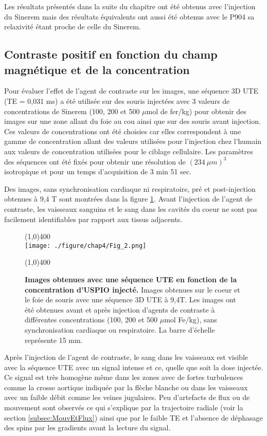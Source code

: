 Les résultats présentés dans la suite du chapitre ont été obtenus avec l'injection du Sinerem mais des résultats équivalents ont aussi été obtenus avec le P904 sa relaxivité étant proche de celle du Sinerem.

\subsection{Contraste positif en fonction du champ magnétique et de la concentration}

Pour évaluer l'effet de l'agent de contraste sur les images, une séquence 3D UTE (TE = 0,031 ms) a été utilisée sur des souris injectées avec 3 valeurs de concentrations de Sinerem (100, 200 et 500 $\mu$mol de fer/kg) pour obtenir des images sur une zone allant du foie au cou ainsi que sur des souris avant injection. Ces valeurs de concentrations ont été choisies car elles correspondent à une gamme de concentration allant des valeurs utilisées pour l'injection chez l'humain aux valeurs de concentration utilisées pour le ciblage cellulaire.
Les paramètres des séquences ont été fixés pour obtenir une résolution de $(234 \ \mu m)^3$ isotropique et pour un temps d'acquisition de 3 min 51 sec.

Des images, sans synchronisation cardiaque ni respiratoire, pré et post-injection obtenues à 9,4 T sont montrées dans la figure \ref{fig:UTEConcen}.  Avant l'injection de l'agent de contraste, les vaisseaux sanguins et le sang dans les cavités du coeur ne sont pas facilement identifiables par rapport aux tissus adjacents.

\begin{figure}[H]
\centering
\line(1,0){400} \\
\texttt{[image: ./figure/chap4/Fig\_2.png]}
\caption[Images obtenues avec une séquence UTE en fonction de la concentration d'USPIO injectés.]{\label{fig:UTEConcen} \textbf{Images obtenues avec une séquence UTE en fonction de la concentration d'USPIO injecté.} Images obtenues sur le coeur et le foie de souris avec une séquence 3D UTE à 9,4T. Les images ont été obtenues avant et après injection d'agents de contraste à différentes concentrations (100, 200 et 500 $\mu$mol Fe/kg), sans synchronisation cardiaque ou respiratoire. La barre d'échelle représente 15 mm.}
\line(1,0){400} \\ 
\end{figure}

Après l'injection de l'agent de contraste, le sang dans les vaisseaux est visible avec la séquence UTE avec un signal intense et ce, quelle que soit la dose injectée. Ce signal est très homogène même dans les zones avec de fortes turbulences comme la crosse aortique indiquée par la flèche blanche ou dans les vaisseaux avec un faible débit comme les veines jugulaires. Peu d'artefacts de flux ou de mouvement sont observés ce qui s'explique par la trajectoire radiale (voir la section \ref{subsec:MouvEtFlux}) ainsi que par le faible TE et l'absence de déphasage des spins par les gradients avant la lecture du signal.

